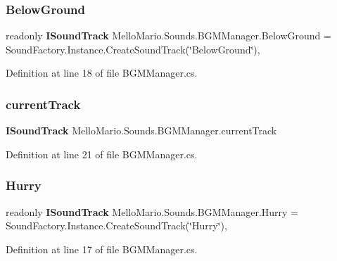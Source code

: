 \subsubsection{Below\+Ground}
{\footnotesize\ttfamily readonly \textbf{ I\+Sound\+Track} Mello\+Mario.\+Sounds.\+B\+G\+M\+Manager.\+Below\+Ground = Sound\+Factory.\+Instance.\+Create\+Sound\+Track(\char`\"{}Below\+Ground\char`\"{})\hspace{0.3cm}{\ttfamily [static]}, {\ttfamily [private]}}



Definition at line 18 of file B\+G\+M\+Manager.\+cs.

\mbox{\label{classMelloMario_1_1Sounds_1_1BGMManager_a8494f282b6a36b4a5dfad772498090c4}} 
\subsubsection{current\+Track}
{\footnotesize\ttfamily \textbf{ I\+Sound\+Track} Mello\+Mario.\+Sounds.\+B\+G\+M\+Manager.\+current\+Track\hspace{0.3cm}{\ttfamily [private]}}



Definition at line 21 of file B\+G\+M\+Manager.\+cs.

\mbox{\label{classMelloMario_1_1Sounds_1_1BGMManager_af741452877c9b5cbad33e468bd240ecd}} 
\subsubsection{Hurry}
{\footnotesize\ttfamily readonly \textbf{ I\+Sound\+Track} Mello\+Mario.\+Sounds.\+B\+G\+M\+Manager.\+Hurry = Sound\+Factory.\+Instance.\+Create\+Sound\+Track(\char`\"{}Hurry\char`\"{})\hspace{0.3cm}{\ttfamily [static]}, {\ttfamily [private]}}



Definition at line 17 of file B\+G\+M\+Manager.\+cs.

\mbox{\label{classMelloMario_1_1Sounds_1_1BGMManager_a27d66169822376c59c1d445efa863c2c}} 
